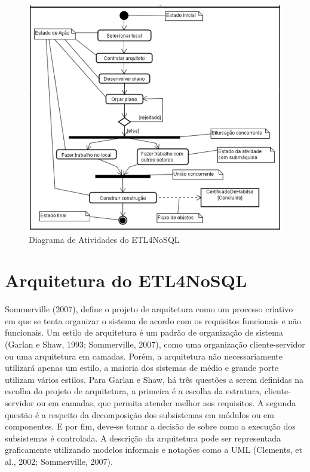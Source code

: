 \begin{figure}[h!]
	\centering
	\includegraphics[scale=0.9]{fig/diagrama_atividades.png}
	\caption{Diagrama de Atividades do ETL4NoSQL}
	\label{diagramaatividades}
\end{figure}



\section{Arquitetura do ETL4NoSQL}


Sommerville (2007), define o projeto de arquitetura como um processo criativo em que se tenta organizar o sistema de acordo com os requisitos funcionais e não funcionais. Um estilo de arquitetura é um padrão de organização de sistema (Garlan e Shaw, 1993; Sommerville, 2007), como uma organização cliente-servidor ou uma arquitetura em camadas. Porém, a arquitetura não necessariamente utilizará apenas um estilo, a maioria dos sistemas de médio e grande porte utilizam vários estilos. Para Garlan e Shaw, há três questões a serem definidas na escolha do projeto de arquitetura, a primeira é a escolha da estrutura, cliente-servidor ou em camadas, que permita atender melhor aos requisitos. A segunda questão é a respeito da decomposição dos subsistemas em módulos ou em componentes. E por fim, deve-se tomar a decisão de sobre como a execução dos subsistemas é controlada. A descrição da arquitetura pode ser representada graficamente utilizando modelos informais e notações como a UML (Clements, et al., 2002; Sommerville, 2007).

